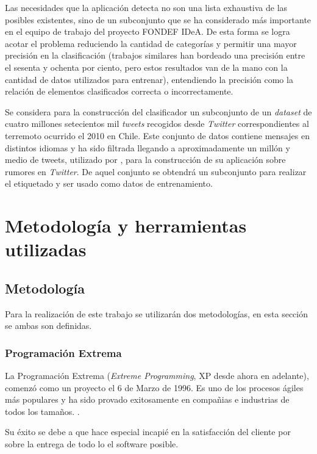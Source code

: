 Las necesidades que la aplicación detecta no son una lista exhaustiva de las posibles existentes, sino de un subconjunto que se ha considerado más importante en el equipo de trabajo del proyecto FONDEF IDeA. De esta forma se logra acotar el problema reduciendo la cantidad de categorías y permitir una mayor precisión en la clasificación (trabajos similares han bordeado una precisión entre el sesenta y ochenta por ciento, pero estos resultados van de la mano con la cantidad de datos utilizados para entrenar), entendiendo la precisión como la relación de elementos clasificados correcta o incorrectamente.

Se considera para la construcción del clasificador un subconjunto de un \textit{dataset} de cuatro millones setecientos mil \textit{tweets} recogidos desde \textit{Twitter} correspondientes al terremoto ocurrido el 2010 en Chile. Este conjunto de datos contiene mensajes en distintos idiomas y ha sido filtrada llegando a aproximadamente un millón y medio de tweets, utilizado por \cite{}, para la construcción de su aplicación sobre rumores en \textit{Twitter}. De aquel conjunto se obtendrá un subconjunto para realizar el etiquetado y ser usado como datos de entrenamiento. 

\section{Metodología y herramientas utilizadas}
\label{intro:metodologia}

\subsection{Metodología}
\label{subsec:MetodologiaDetalle}

Para la realización de este trabajo se utilizarán dos metodologías, en esta sección se ambas son definidas.

\subsubsection{Programación Extrema}
\label{subsubsec:XP}

La Programación Extrema (\textit{Extreme Programming}, XP desde ahora en adelante), comenzó como un proyecto el 6 de Marzo de 1996. Es uno de los procesos ágiles más populares y ha sido provado exitosamente en compañias e industrias de todos los tamaños. \cite{xP}.

Su éxito se debe a que hace especial incapié en la satisfacción del cliente por sobre la entrega de todo lo el software posible.

